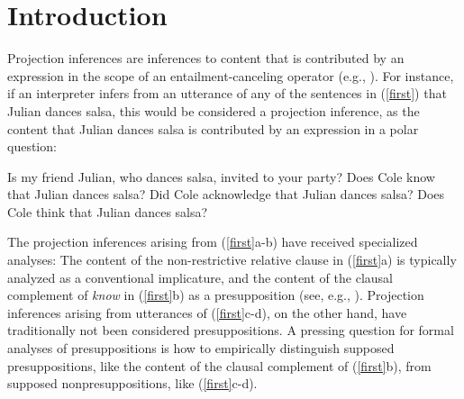 \documentclass[11pt,fleqn]{article}
\newcommand{\6}{\mbox{$[\hspace*{-.6mm}[$}}
\newcommand{\9}{\mbox{$]\hspace*{-.6mm}]$}}
\begin{document}
\section{Introduction}\label{s1}

Projection inferences are inferences to content that is contributed by an expression in the scope of an entailment-canceling operator (e.g., \citealt{potts05,brst-lang11,tbd-variability,degen-tonhauser-language}). For instance, if an interpreter infers from an utterance of any of the sentences in (\ref{first}) that Julian dances salsa, this would be considered a projection inference, as the content that Julian dances salsa is contributed by an expression in a polar question:
\begin{exe}
\ex\label{first} 
\begin{xlist}
\ex Is my friend Julian, who dances salsa, invited to your party?
\ex Does Cole know that Julian dances salsa?
\ex Did Cole acknowledge that Julian dances salsa?
\ex Does Cole think that Julian dances salsa?
\end{xlist}
\end{exe}
The projection inferences arising from (\ref{first}a-b) have received specialized analyses: The content of the non-restrictive relative clause in (\ref{first}a) is typically analyzed as a conventional implicature, and the content of the clausal complement of \emph{know} in (\ref{first}b) as a presupposition (see, e.g., \citealt{ccmg90,potts05,brst-lang11}).  Projection inferences arising from utterances of (\ref{first}c-d), on the other hand, have traditionally not been considered presuppositions. A pressing question for formal analyses of presuppositions is how to empirically distinguish supposed presuppositions, like the content of the clausal complement of (\ref{first}b), from supposed nonpresuppositions, like (\ref{first}c-d). 
\end{document}
